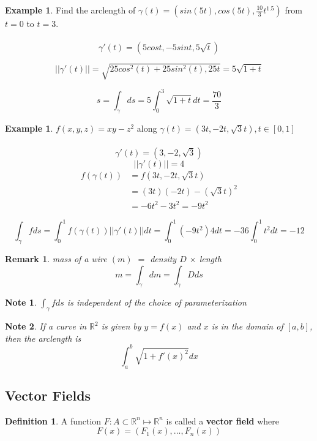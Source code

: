 \documentclass[12pt]{article}
\theoremstyle{plain}
\newtheorem*{remark}{Remark}
\newtheorem*{note}{Note}
\theoremstyle{definition}
\newtheorem{definition}[theorem]{Definition}
\newtheorem{example}[theorem]{Example}
\begin{document}
\begin{example}
	Find the arclength of $\gamma (t) = (sin(5t), cos(5t), \frac{10}{3} t^{1.5})$ from $t=0$ to $t=3$.\\
	\\
	$$\gamma ' (t) = (5cost, -5sint, 5 \sqrt{t})$$

	$$||\gamma ' (t)|| = \sqrt{25cos^2 (t) + 25sin^2 (t), 25 t} = 5\sqrt{1+t}$$

	$$s = \int_\gamma ds = 5 \int_0^3 \sqrt{1+t} dt = \frac{70}{3}$$
\end{example}

\begin{example}
	$f(x,y,z) = xy-z^2$ along $\gamma (t) = (3t, -2t, \sqrt{3}t), t\in [0,1]$\\
	\\
	$$\gamma ' (t) = (3, -2, \sqrt{3})$$
	$$||\gamma ' (t)|| = 4$$
	\begin{align*}
		f(\gamma (t)) &= f(3t, -2t, \sqrt{3}t)\\
		&=(3t)(-2t) - (\sqrt{3}t)^2\\
		&= -6t^2 - 3t^2 = -9t^2
	\end{align*}

	$$\int_\gamma f ds = \int_0^1 f(\gamma (t))||\gamma ' (t)||dt = \int_0^1 (-9t^2)4dt = -36 \int_0^1 t^2 dt = -12$$

\end{example}

\begin{remark}
	mass of a wire $(m)$ $=$ density $D$ $\times$ length
	$$m = \int_\gamma dm = \int_\gamma D ds$$
\end{remark}

\begin{note}
	$\int_\gamma f ds$ is independent of the choice of parameterization
\end{note}

\begin{note}
	If a curve in $\mathbb{R}^2$ is given by $y=f(x)$ and $x$ is in the domain of $[a,b]$, then the arclength is $$\int_a^b \sqrt{1+f'(x)^2} dx$$
\end{note}

\subsection{Vector Fields}

\begin{definition}
	A function $F:A \subset \mathbb{R}^n \mapsto \mathbb{R}^n$ is called a \textbf{vector field} where
	$$F(x) = (F_1(x), ..., F_n(x))$$
\end{definition}
\end{document}
